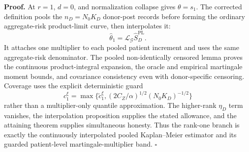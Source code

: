 \textbf{Proof.}
At \(r=1\), \(d=0\), and normalization collapse gives \(\theta=s_1\). The corrected definition pools the \(n_D=N_0K_D\) donor-post records before forming the ordinary aggregate-risk product-limit curve, then interpolates it:
\[
 \widehat\theta_1=\mathcal L_{\mathcal G}\widehat S_D^{\mathrm{PL}}. \tag{1}
\]
It attaches one multiplier to each pooled patient increment and uses the same aggregate-risk denominator. The pooled non-identically censored lemma proves the continuous product-integral expansion, the oracle and empirical martingale moment bounds, and covariance consistency even with donor-specific censoring. Coverage uses the explicit deterministic guard
\[
 c_1^\xi=\max\{\widetilde c_1^\xi,
 (2C_Z/\alpha)^{1/2}(N_0K_D)^{-1/2}\}
\]
rather than a multiplier-only quantile approximation. The higher-rank \(\eta_D\) term vanishes, the interpolation proposition supplies the stated allowance, and the attaining theorem supplies simultaneous honesty. Thus the rank-one branch is exactly the continuously interpolated pooled Kaplan--Meier estimator and its guarded patient-level martingale-multiplier band. \(\square\)